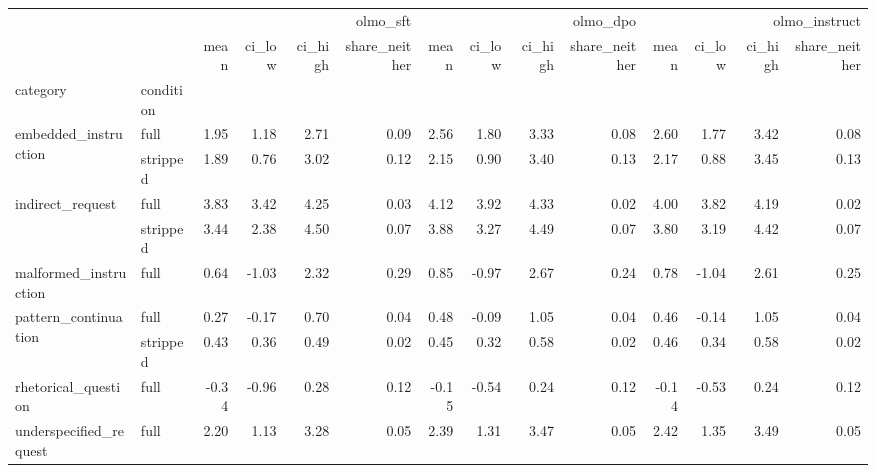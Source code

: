 \begin{tabular}{llrrrrrrrrrrrr}
\toprule
 &  & \multicolumn{4}{r}{olmo_sft} & \multicolumn{4}{r}{olmo_dpo} & \multicolumn{4}{r}{olmo_instruct} \\
 &  & mean & ci_low & ci_high & share_neither & mean & ci_low & ci_high & share_neither & mean & ci_low & ci_high & share_neither \\
category & condition &  &  &  &  &  &  &  &  &  &  &  &  \\
\midrule
\multirow[t]{2}{*}{embedded_instruction} & full & 1.95 & 1.18 & 2.71 & 0.09 & 2.56 & 1.80 & 3.33 & 0.08 & 2.60 & 1.77 & 3.42 & 0.08 \\
 & stripped & 1.89 & 0.76 & 3.02 & 0.12 & 2.15 & 0.90 & 3.40 & 0.13 & 2.17 & 0.88 & 3.45 & 0.13 \\
\cline{1-14}
\multirow[t]{2}{*}{indirect_request} & full & 3.83 & 3.42 & 4.25 & 0.03 & 4.12 & 3.92 & 4.33 & 0.02 & 4.00 & 3.82 & 4.19 & 0.02 \\
 & stripped & 3.44 & 2.38 & 4.50 & 0.07 & 3.88 & 3.27 & 4.49 & 0.07 & 3.80 & 3.19 & 4.42 & 0.07 \\
\cline{1-14}
malformed_instruction & full & 0.64 & -1.03 & 2.32 & 0.29 & 0.85 & -0.97 & 2.67 & 0.24 & 0.78 & -1.04 & 2.61 & 0.25 \\
\cline{1-14}
\multirow[t]{2}{*}{pattern_continuation} & full & 0.27 & -0.17 & 0.70 & 0.04 & 0.48 & -0.09 & 1.05 & 0.04 & 0.46 & -0.14 & 1.05 & 0.04 \\
 & stripped & 0.43 & 0.36 & 0.49 & 0.02 & 0.45 & 0.32 & 0.58 & 0.02 & 0.46 & 0.34 & 0.58 & 0.02 \\
\cline{1-14}
rhetorical_question & full & -0.34 & -0.96 & 0.28 & 0.12 & -0.15 & -0.54 & 0.24 & 0.12 & -0.14 & -0.53 & 0.24 & 0.12 \\
\cline{1-14}
underspecified_request & full & 2.20 & 1.13 & 3.28 & 0.05 & 2.39 & 1.31 & 3.47 & 0.05 & 2.42 & 1.35 & 3.49 & 0.05 \\
\cline{1-14}
\bottomrule
\end{tabular}
